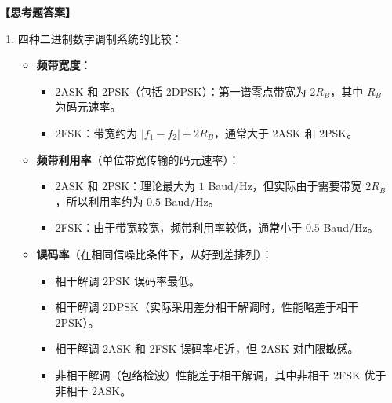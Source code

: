 \documentclass[a4paper,11pt]{ctexart}
\begin{document}
\noindent\textbf{【思考题答案】}
\begin{enumerate}
    \item 四种二进制数字调制系统的比较：
        \begin{itemize}
            \item \textbf{频带宽度}：
                \begin{itemize}
                    \item 2ASK 和 2PSK（包括 2DPSK）：第一谱零点带宽为 $2R_B$，其中 $R_B$ 为码元速率。
                    \item 2FSK：带宽约为 $|f_1 - f_2| + 2R_B$，通常大于 2ASK 和 2PSK。
                \end{itemize}
            \item \textbf{频带利用率}（单位带宽传输的码元速率）：
                \begin{itemize}
                    \item 2ASK 和 2PSK：理论最大为 $1$ Baud/Hz，但实际由于需要带宽 $2R_B$，所以利用率约为 $0.5$ Baud/Hz。
                    \item 2FSK：由于带宽较宽，频带利用率较低，通常小于 $0.5$ Baud/Hz。
                \end{itemize}
            \item \textbf{误码率}（在相同信噪比条件下，从好到差排列）：
                \begin{itemize}
                    \item 相干解调 2PSK 误码率最低。
                    \item 相干解调 2DPSK（实际采用差分相干解调时，性能略差于相干 2PSK）。
                    \item 相干解调 2ASK 和 2FSK 误码率相近，但 2ASK 对门限敏感。
                    \item 非相干解调（包络检波）性能差于相干解调，其中非相干 2FSK 优于非相干 2ASK。
                \end{itemize}
        \end{itemize}


\end{enumerate}
\end{document}
